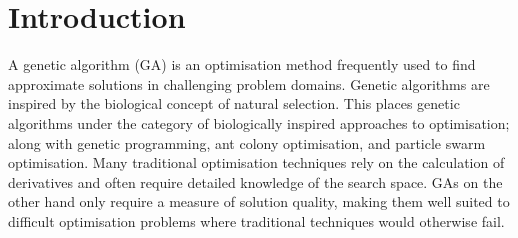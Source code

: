 \documentclass[journal]{IEEEtran}
\begin{document}




\maketitle









%
\IEEEpeerreviewmaketitle



\section{Introduction}

\noindent 
A genetic algorithm (GA) is an optimisation method frequently used to find approximate solutions in challenging problem domains. Genetic algorithms are inspired by the biological concept of natural selection. This places genetic algorithms under the category of biologically inspired approaches to optimisation; along with genetic programming, ant colony optimisation, and particle swarm optimisation. Many traditional optimisation techniques rely on the calculation of derivatives and often require detailed knowledge of the search space. GAs on the other hand only require a measure of solution quality, making them well suited to difficult optimisation problems where traditional techniques would otherwise fail.
\end{document}
